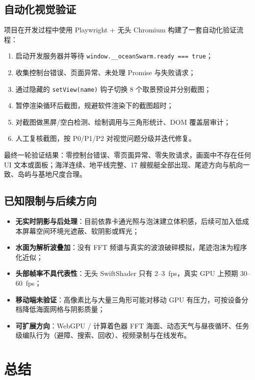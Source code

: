 \documentclass[UTF8, a4paper, 11pt]{ctexart}
\newcommand{\file}[1]{\texttt{#1}}
\begin{document}
\subsection{自动化视觉验证}

项目在开发过程中使用 Playwright + 无头 Chromium 构建了一套自动化验证流程：

\begin{enumerate}
  \item 启动开发服务器并等待 \verb|window.__oceanSwarm.ready === true|；
  \item 收集控制台错误、页面异常、未处理 Promise 与失败请求；
  \item 通过隐藏的 \file{setView(name)} 钩子切换 8 个取景预设并分别截图；
  \item 暂停渲染循环后截图，规避软件渲染下的截图超时；
  \item 对截图做黑屏/空白检测、绘制调用与三角形统计、DOM 覆盖层审计；
  \item 人工复核截图，按 P0/P1/P2 对视觉问题分级并迭代修复。
\end{enumerate}

最终一轮验证结果：零控制台错误、零页面异常、零失败请求，画面中不存在任何 UI 文本或面板；海洋连续、地平线完整、17 艘舰艇全部出现、尾迹方向与航向一致、岛屿与基地尺度合理。

\subsection{已知限制与后续方向}

\begin{itemize}
  \item \textbf{无实时阴影与后处理}：目前依靠卡通光照与泡沫建立体积感，后续可加入低成本屏幕空间环境光遮蔽、软阴影或辉光；
  \item \textbf{水面为解析波叠加}：没有 FFT 频谱与真实的波浪破碎模拟，尾迹泡沫为程序化近似；
  \item \textbf{头部帧率不具代表性}：无头 SwiftShader 只有 2--3~fps，真实 GPU 上预期 30--60~fps；
  \item \textbf{移动端未验证}：高像素比与大量三角形可能对移动 GPU 有压力，可按设备分档降低海面网格与阴影质量；
  \item \textbf{可扩展方向}：WebGPU / 计算着色器 FFT 海面、动态天气与昼夜循环、任务级编队行为（避障、搜索、回收）、视频录制与在线发布。
\end{itemize}

\section{总结}
\end{document}
